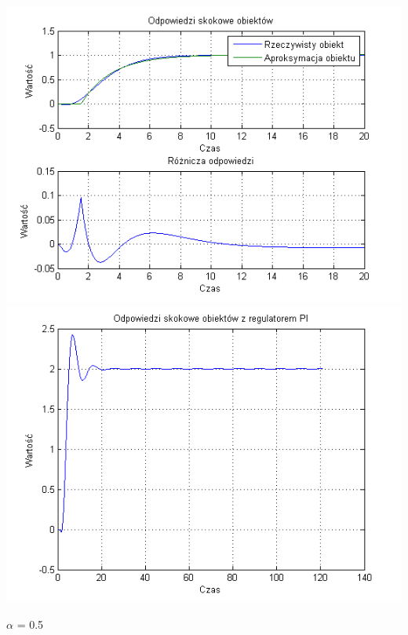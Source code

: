 \documentclass[10pt,a4paper]{article}
\begin{document}
\begin{center}
\includegraphics[scale=1]{images/jeden/skrypt_231.png}\\
\includegraphics[scale=1]{images/jeden/skrypt_232.png}\\
\end{center}
\newpage
$\alpha$ = 0.5
\end{document}

